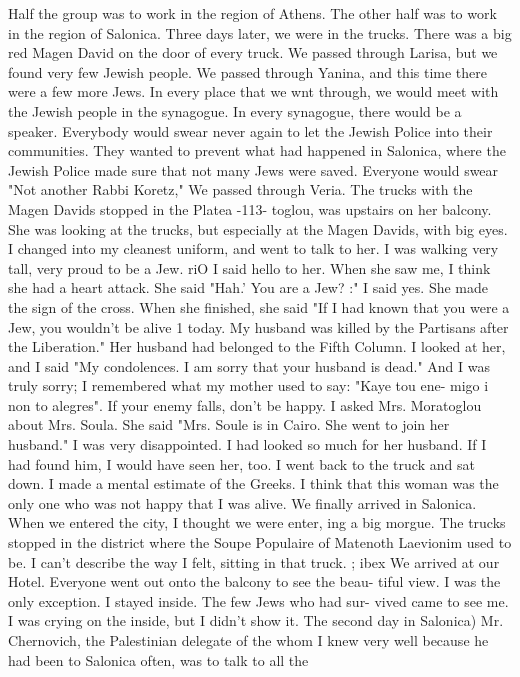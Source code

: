 Half the group 
was to work in the region of Athens.
The other half was to work in the region of 
Salonica.
Three days later, we were in the trucks.
There was a big red Magen David on the 
door of every truck.
We passed through Larisa, but we found very few Jewish people.
We passed through Yanina, and this time there were a few more Jews.
In every place 
that we wnt through, we would meet with the Jewish people in the synagogue.
In every 
synagogue, there would be a speaker.
Everybody would swear never again to let the 
Jewish Police into their communities.
They wanted to prevent what had happened in 
Salonica, where the Jewish Police made sure that not many Jews were saved.
Everyone 
would swear "Not another Rabbi Koretz," 
We passed through Veria.
The trucks with the Magen Davids stopped in the Platea 
-113- 
toglou, was upstairs on her balcony.
She was looking at the trucks, but especially 
at the Magen Davids, with big eyes.
I changed into my cleanest uniform, and went 
to talk to her.
I was walking very tall, very proud to be a Jew.
riO I said hello to 
her.
When she saw me, I think she had a heart attack.
She said "Hah.'
You are a Jew?
:" I said yes.
She made the sign of the cross.
When she finished, she said "If I had known that you were a Jew, you wouldn't be alive 1 
today.
My husband was killed by the Partisans after the Liberation."
Her husband had 
belonged to the Fifth Column.
I looked at her, and I said "My condolences.
I am sorry that your husband is 
dead."
And I was truly sorry; I remembered what my mother used to say: "Kaye tou ene-
migo i non to alegres".
If your enemy falls, don't be happy.
I asked Mrs.
Moratoglou 
about Mrs.
Soula.
She said "Mrs.
Soule is in Cairo.
She went to join her husband."
I was very disappointed.
I had looked so much for her husband.
If I had found him, I 
would have seen her, too.
I went back to the truck and sat down.
I made a mental estimate of the Greeks.
I think that this woman was the only one who was not happy that I was alive.
We finally arrived in Salonica.
When we entered the city, I thought we were enter, 
ing a big morgue.
The trucks stopped in the district where the Soupe Populaire of 
Matenoth Laevionim used to be.
I can't describe the way I felt, sitting in that truck.
; 
ibex We arrived at our Hotel.
Everyone went out onto the balcony to see the beau-
tiful view.
I was the only exception.
I stayed inside.
The few Jews who had sur-
vived came to see me.
I was crying on the inside, but I didn't show it.
The second day in Salonica) Mr.
Chernovich, the Palestinian delegate of the 
whom I knew very well because he had been to Salonica often, was to talk to all the 
